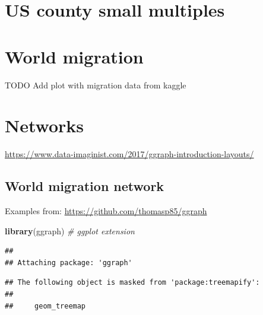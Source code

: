 \documentclass[]{krantz}
\makeatletter
\newenvironment{Shaded}{\begin{snugshade}}{\end{snugshade}}
\newcommand{\KeywordTok}[1]{\textcolor[rgb]{0.13,0.29,0.53}{\textbf{#1}}}
\newcommand{\CommentTok}[1]{\textcolor[rgb]{0.56,0.35,0.01}{\textit{#1}}}
\newcommand{\NormalTok}[1]{#1}
\newenvironment{kframe}{%
\medskip{}
\setlength{\fboxsep}{.8em}
 \def\at@end@of@kframe{}%
 \ifinner\ifhmode%
  \def\at@end@of@kframe{\end{minipage}}%
  \begin{minipage}{\columnwidth}%
 \fi\fi%
 \def\FrameCommand##1{\hskip\@totalleftmargin \hskip-\fboxsep
 \colorbox{shadecolor}{##1}\hskip-\fboxsep
     \hskip-\linewidth \hskip-\@totalleftmargin \hskip\columnwidth}%
 \MakeFramed {\advance\hsize-\width
   \@totalleftmargin\z@ \linewidth\hsize
   \@setminipage}}%
 {\par\unskip\endMakeFramed%
 \at@end@of@kframe}
\renewenvironment{Shaded}{\begin{kframe}}{\end{kframe}}
\theoremstyle{definition}
\theoremstyle{definition}
\theoremstyle{definition}
\theoremstyle{remark}
\makeatother
\begin{document}
\section{US county small multiples}\label{us-county-small-multiples}

\section{World migration}\label{world-migration}

TODO Add plot with migration data from kaggle

\section{Networks}\label{networks}

\url{https://www.data-imaginist.com/2017/ggraph-introduction-layouts/}

\subsection{World migration network}\label{world-migration-network}

Examples from: \url{https://github.com/thomasp85/ggraph}

\begin{Shaded}
\begin{Highlighting}[]
\KeywordTok{library}\NormalTok{(ggraph) }\CommentTok{# ggplot extension}
\end{Highlighting}
\end{Shaded}

\begin{verbatim}
## 
## Attaching package: 'ggraph'
\end{verbatim}

\begin{verbatim}
## The following object is masked from 'package:treemapify':
## 
##     geom_treemap
\end{verbatim}
\end{document}
